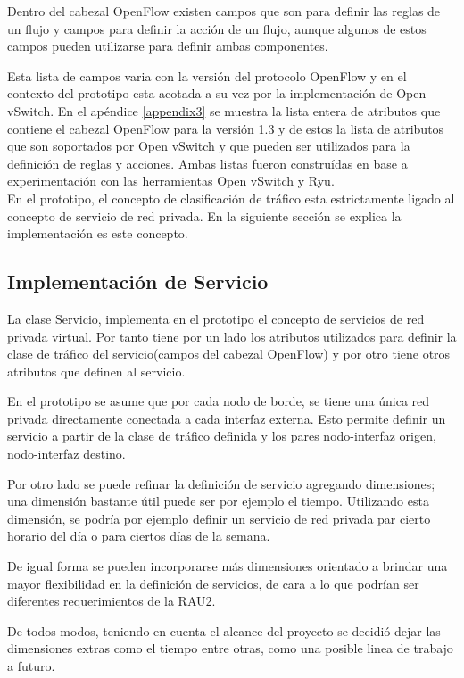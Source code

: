 Dentro del cabezal OpenFlow existen campos que son para definir las reglas de un flujo y campos para definir la acci\'on de un flujo, aunque algunos de estos campos pueden utilizarse para definir ambas componentes.  

Esta lista de campos varia con la versi\'on del protocolo OpenFlow y en el contexto del prototipo esta acotada a su vez por la implementaci\'on de Open vSwitch. En el ap\'endice \ref{appendix3} se muestra  la lista entera de atributos que contiene el cabezal OpenFlow para la versi\'on 1.3 y de estos la lista de atributos que son soportados por Open vSwitch y que pueden ser utilizados para la definici\'on de reglas y acciones. Ambas listas fueron constru\'idas en base a experimentaci\'on con las herramientas Open vSwitch y Ryu.\\

En el prototipo, el concepto de clasificaci\'on de tr\'afico esta estrictamente ligado al concepto de servicio de red privada. En la siguiente secci\'on se explica la implementaci\'on es este concepto.
 
\subsection{Implementación de Servicio}

La clase Servicio, implementa en el prototipo el concepto de servicios de red privada virtual. Por tanto tiene por un lado los atributos utilizados para definir la clase de tr\'afico del servicio(campos del cabezal OpenFlow) y por otro tiene otros atributos que definen al servicio.

En el prototipo se asume que por cada nodo de borde, se tiene una \'unica red privada directamente conectada a cada interfaz externa. Esto permite definir un servicio a partir de la clase de tr\'afico definida y los pares nodo-interfaz origen, nodo-interfaz destino.

Por otro lado se puede refinar la definici\'on de servicio agregando dimensiones; una dimensi\'on bastante \'util puede ser por ejemplo el tiempo. Utilizando esta dimensi\'on, se podr\'ia por ejemplo definir un servicio de red privada par cierto horario del d\'ia o para ciertos d\'ias de la semana.

De igual forma se pueden incorporarse m\'as dimensiones orientado a brindar una mayor flexibilidad en la definici\'on de servicios, de cara a lo que podr\'ian ser diferentes requerimientos de la RAU2. 

De todos modos, teniendo en cuenta el alcance del proyecto se decidi\'o dejar las dimensiones extras como el tiempo entre otras, como una posible linea de trabajo a futuro.\\ 


